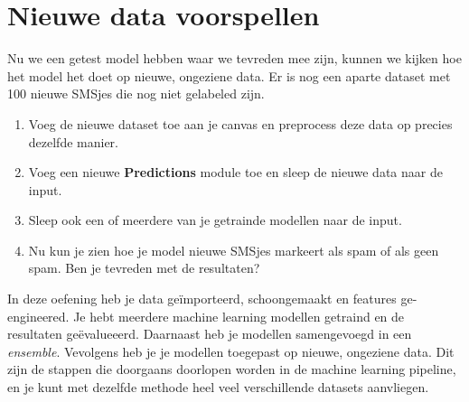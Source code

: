 \documentclass{article}
\newcommand{\tb}[1]{\textbf{#1}}
\begin{document}
\section{Nieuwe data voorspellen}
Nu we een getest model hebben waar we tevreden mee zijn, kunnen we kijken hoe het model het doet op nieuwe, ongeziene data. Er is nog een aparte dataset met 100 nieuwe SMSjes die nog niet gelabeled zijn.
\begin{enumerate}
\item Voeg de nieuwe dataset toe aan je canvas en preprocess deze data op precies dezelfde manier.
\item Voeg een nieuwe \tb{Predictions} module toe en sleep de nieuwe data naar de input.
\item Sleep ook een of meerdere van je getrainde modellen naar de input.
\item Nu kun je zien hoe je model nieuwe SMSjes markeert als spam of als geen spam. Ben je tevreden met de resultaten?
\end{enumerate}

In deze oefening heb je data ge\"importeerd, schoongemaakt en features ge-engineered. Je hebt meerdere machine learning modellen getraind en de resultaten ge\"evalueeerd. Daarnaast heb je modellen samengevoegd in een \textit{ensemble}. Vevolgens heb je je modellen toegepast op nieuwe, ongeziene data. Dit zijn de stappen die doorgaans doorlopen worden in de machine learning pipeline, en je kunt met dezelfde methode heel veel verschillende datasets aanvliegen.
\end{document}
